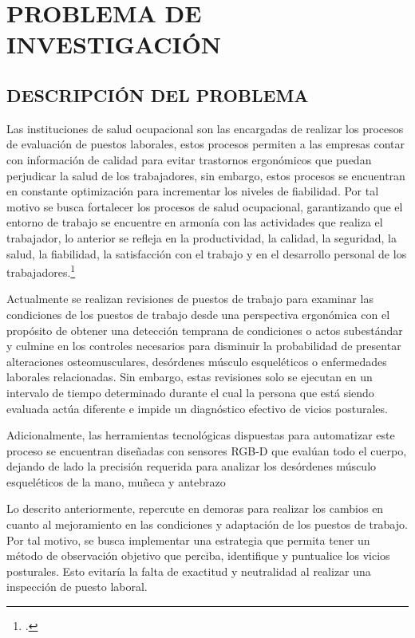 \chapter{PROBLEMA DE INVESTIGACIÓN}

\section{DESCRIPCIÓN DEL PROBLEMA}
Las instituciones de salud ocupacional son las encargadas de realizar los procesos de evaluación de puestos laborales, estos procesos permiten a las empresas contar con información de calidad para evitar trastornos ergonómicos que puedan perjudicar la salud de los trabajadores, sin embargo, estos procesos se encuentran en constante optimización para incrementar los niveles de fiabilidad. Por tal motivo se busca fortalecer los procesos de salud ocupacional, garantizando que el entorno de trabajo se encuentre en armonía con las actividades que realiza el trabajador, lo anterior se refleja en la productividad, la calidad, la seguridad, la salud, la fiabilidad, la satisfacción con el trabajo y en el desarrollo personal de los trabajadores.\footcite[3]{MiguelAGonzalezPerez}

Actualmente se realizan revisiones de puestos de trabajo para examinar las condiciones de los puestos de trabajo desde una perspectiva ergonómica con el propósito de obtener una detección temprana de condiciones o actos subestándar y culmine en los controles necesarios para disminuir la probabilidad de presentar alteraciones osteomusculares, desórdenes músculo esqueléticos o enfermedades laborales relacionadas. Sin embargo, estas revisiones solo se ejecutan en un intervalo de tiempo determinado durante el cual la persona que está siendo evaluada actúa diferente e impide un diagnóstico efectivo de vicios posturales. 

Adicionalmente, las herramientas tecnológicas dispuestas para automatizar este proceso se encuentran diseñadas con sensores RGB-D que evalúan todo el cuerpo, dejando de lado la precisión requerida para analizar los desórdenes músculo esqueléticos de la mano, muñeca y antebrazo

Lo descrito anteriormente, repercute en demoras para realizar los cambios en cuanto al mejoramiento en las condiciones y adaptación de los puestos de trabajo. Por tal motivo, se busca implementar una estrategia que permita tener un método de observación objetivo que perciba, identifique y puntualice los vicios posturales. Esto evitaría la falta de exactitud y neutralidad al realizar una inspección de puesto laboral.


